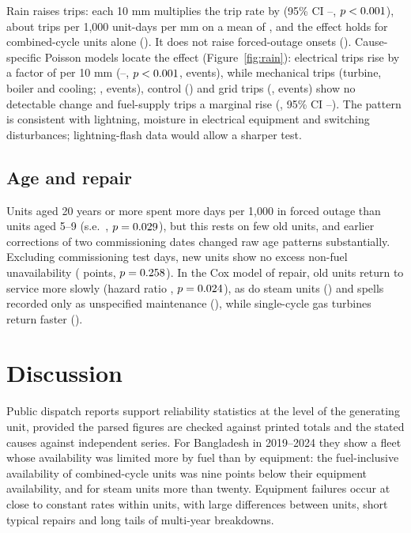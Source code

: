 \documentclass[11pt]{article}
\begin{document}
Rain raises trips: each 10 mm multiplies the trip rate by \rainTripIRR{} (95\% CI \rainTripIRRLo--\rainTripIRRHi, $p<0.001$), about \rainLpmB{} trips per 1,000 unit-days per mm on a mean of \tripMean, and the effect holds for combined-cycle units alone (\rainTripCcgtIRR). It does not raise forced-outage onsets (\rainOnsetIRR). Cause-specific Poisson models locate the effect (Figure~\ref{fig:rain}): electrical trips rise by a factor of \rainElec{} per 10 mm (\rainElecLo--\rainElecHi, $p<0.001$, \rainElecN{} events), while mechanical trips (turbine, boiler and cooling; \rainMech, \rainMechN{} events), control (\rainCtrl) and grid trips (\rainGrid, \rainGridN{} events) show no detectable change and fuel-supply trips a marginal rise (\rainFuel, 95\% CI \rainFuelLo--\rainFuelHi). The pattern is consistent with lightning, moisture in electrical equipment and switching disturbances; lightning-flash data would allow a sharper test.

\subsection{Age and repair}
Units aged 20 years or more spent \ageOldB{} more days per 1,000 in forced outage than units aged 5--9 (s.e.\ \ageOldSE, $p=0.029$), but this rests on few old units, and earlier corrections of two commissioning dates changed raw age patterns substantially. Excluding commissioning test days, new units show no excess non-fuel unavailability (\newUnitB{} points, $p=0.258$). In the Cox model of repair, old units return to service more slowly (hazard ratio \coxOldHR, $p=0.024$), as do steam units (\coxSteamHR) and spells recorded only as unspecified maintenance (\coxUnspecHR), while single-cycle gas turbines return faster (\coxGTHR).

\section{Discussion}

Public dispatch reports support reliability statistics at the level of the generating unit, provided the parsed figures are checked against printed totals and the stated causes against independent series. For Bangladesh in 2019--2024 they show a fleet whose availability was limited more by fuel than by equipment: the fuel-inclusive availability of combined-cycle units was nine points below their equipment availability, and for steam units more than twenty. Equipment failures occur at close to constant rates within units, with large differences between units, short typical repairs and long tails of multi-year breakdowns.
\end{document}
